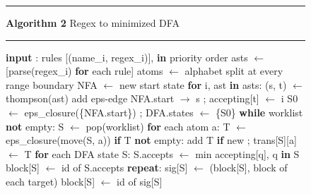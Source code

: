 \documentclass[journal,onecolumn,12pt,a4paper]{IEEEtran}
\begin{document}
\begin{figure}[!t]
\centering
\begin{minipage}[t]{0.485\textwidth}
\hrule\vspace{2pt}\scriptsize{}\label{alg:2}\textbf{Algorithm 2} Regex to minimized DFA\vspace{2pt}\hrule\vspace{1pt}
\begin{algorithmic}[1]
\State \hspace*{1.0em}\textbf{input} : rules [(name\_i, regex\_i)], \textbf{in} priority order
\State \hspace*{1.0em}asts  $\leftarrow$ [parse(regex\_i) \textbf{for} each rule]
\State \hspace*{1.0em}atoms $\leftarrow$ alphabet split at every range boundary
\State \hspace*{1.0em}NFA   $\leftarrow$ new start state
\State \hspace*{1.0em}\textbf{for} i, ast \textbf{in} asts:
\State \hspace*{2.0em}(s, t) $\leftarrow$ thompson(ast)
\State \hspace*{2.0em}add eps-edge NFA.start $\rightarrow$ s ; accepting[t] $\leftarrow$ i
\State \hspace*{1.0em}S0 $\leftarrow$ eps\_closure(\{NFA.start\}) ; DFA.states $\leftarrow$ \{S0\}
\State \hspace*{1.0em}\textbf{while} worklist \textbf{not} empty:
\State \hspace*{2.0em}S $\leftarrow$ pop(worklist)
\State \hspace*{2.0em}\textbf{for} each atom a:
\State \hspace*{3.0em}T $\leftarrow$ eps\_closure(move(S, a))
\State \hspace*{3.0em}\textbf{if} T \textbf{not} empty: add T \textbf{if} new ; trans[S][a] $\leftarrow$ T
\State \hspace*{1.0em}\textbf{for} each DFA state S:
\State \hspace*{2.0em}S.accepts $\leftarrow$ min accepting[q], q \textbf{in} S
\Statex {}
\State \hspace*{1.0em}block[S] $\leftarrow$ id of S.accepts
\State \hspace*{1.0em}\textbf{repeat}:
\State \hspace*{2.0em}sig[S] $\leftarrow$ (block[S], block of each target)
\State \hspace*{2.0em}block[S] $\leftarrow$ id of sig[S]

\end{algorithmic}
\end{minipage}
\end{figure}
\end{document}
